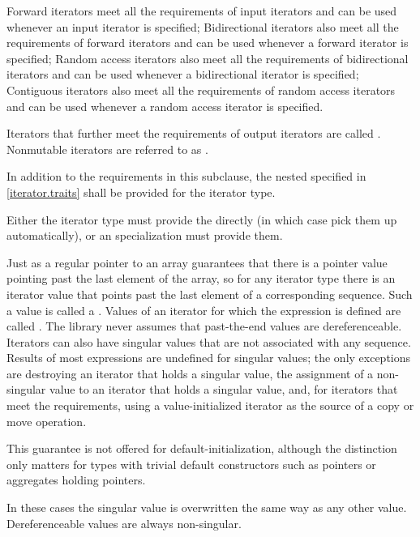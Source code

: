 \pnum
Forward iterators meet all the requirements of input
iterators and can be used whenever
an input iterator is specified;
Bidirectional iterators also meet all the requirements of
forward iterators and can be used whenever a forward iterator is specified;
Random access iterators also meet all the requirements of bidirectional
iterators and can be used whenever a bidirectional iterator is specified;
Contiguous iterators also meet all the requirements of random access
iterators and can be used whenever a random access iterator is specified.

\pnum
Iterators that further meet the requirements of output iterators are
called . Nonmutable iterators are referred to
as .

\pnum
In addition to the requirements in this subclause,
the nested  specified in \ref{iterator.traits}
shall be provided for the iterator type.
\begin{note}
Either the iterator type must provide the  directly
(in which case  pick them up automatically), or
an  specialization must provide them.
\end{note}

\pnum
{}%
%
Just as a regular pointer to an array guarantees that there is a pointer value pointing past the last element
of the array, so for any iterator type there is an iterator value that points past the last element of a
corresponding sequence.
Such a value is called a .
Values of an iterator 
for which the expression  is defined
are called .
The library never assumes that past-the-end values are dereferenceable.
Iterators can also have singular values that are not associated with any
sequence.
Results of most expressions are undefined for singular values;
the only exceptions are destroying an iterator that holds a singular value,
the assignment of a non-singular value to
an iterator that holds a singular value, and, for iterators that meet the
 requirements, using a value-initialized iterator
as the source of a copy or move operation.
\begin{note}
This guarantee is not
offered for default-initialization, although the distinction only matters for types
with trivial default constructors such as pointers or aggregates holding pointers.
\end{note}
In these cases the singular
value is overwritten the same way as any other value.
Dereferenceable
values are always non-singular.


